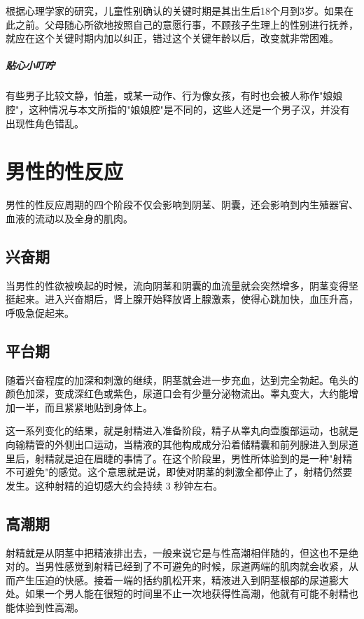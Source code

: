 根据心理学家的研究，儿童性别确认的关键时期是其出生后18个月到3岁。如果在此之前。父母随心所欲地按照自己的意愿行事，不顾孩子生理上的性别进行抚养，就应在这个关键时期内加以纠正，错过这个关键年龄以后，改变就非常困难。

\subparagraph{贴心小叮咛}

有些男子比较文静，怕羞，或某一动作、行为像女孩，有时也会被人称作"娘娘腔"，这种情况与本文所指的"娘娘腔"是不同的，这些人还是一个男子汉，并没有出现性角色错乱。

\section{男性的性反应}

男性的性反应周期的四个阶段不仅会影响到阴茎、阴囊，还会影响到内生殖器官、血液的流动以及全身的肌肉。

\subsection{兴奋期}

当男性的性欲被唤起的时候，流向阴茎和阴囊的血流量就会突然增多，阴茎变得坚挺起来。进入兴奋期后，肾上腺开始释放肾上腺激素，使得心跳加快，血压升高，呼吸急促起来。

\subsection{平台期}

随着兴奋程度的加深和刺激的继续，阴茎就会进一步充血，达到完全勃起。龟头的颜色加深，变成深红色或紫色，尿道口会有少量分泌物流出。睾丸变大，大约能增加一半，而且紧紧地贴到身体上。

这一系列变化的结果，就是射精进入准备阶段，精子从睾丸向壶腹部运动，也就是向输精管的外侧出口运动，当精液的其他构成成分沿着储精囊和前列腺进入到尿道里后，射精就是迫在眉睫的事情了。在这个阶段里，男性所体验到的是一种"射精不可避免"的感觉。这个意思就是说，即使对阴茎的刺激全都停止了，射精仍然要发生。这种射精的迫切感大约会持续 3 秒钟左右。

\subsection{高潮期}

射精就是从阴茎中把精液排出去，一般来说它是与性高潮相伴随的，但这也不是绝对的。当男性感觉到射精已经到了不可避免的时候，尿道两端的肌肉就会收紧，从而产生压迫的快感。接着一端的括约肌松开来，精液进入到阴茎根部的尿道膨大处。如果一个男人能在很短的时间里不止一次地获得性高潮，他就有可能不射精也能体验到性高潮。

